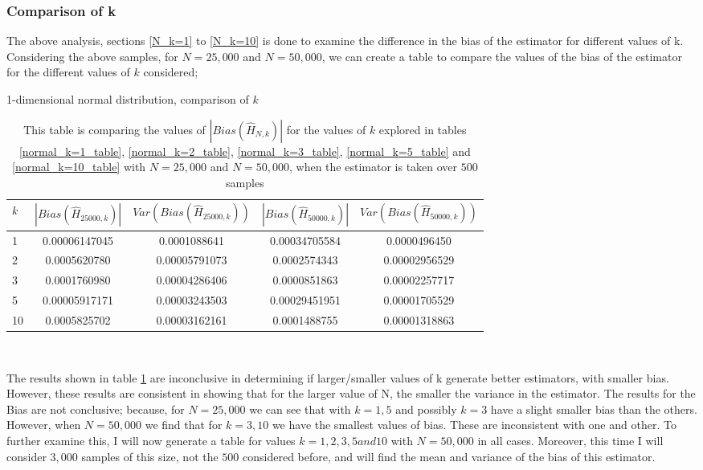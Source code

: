 \documentclass{article}
\begin{document}
\subsubsection{Comparison of k}

The above analysis, sections \ref{N_k=1} to \ref{N_k=10} is done to examine the difference in the bias of the estimator for different values of k. Considering the above samples, for $N=25,000$ and $N=50,000$, we can create a table to compare the values of the bias of the estimator for the different values of $k$ considered;

\begin{table}
\caption{1-dimensional normal distribution, comparison of $k$} \label{normal_kcompare_table}
\begin{center}
\begin{tabular}{| l | c c c c|} 
\toprule
$k$ & $|Bias(\hat{H}_{25000, k})|$ & $Var(Bias(\hat{H}_{25000, k}))$ & $|Bias(\hat{H}_{50000, k})|$ & $Var(Bias(\hat{H}_{50000, k}) )$ \\
\midrule[1pt]
1    & 0.00006147045   & 0.0001088641     & 0.00034705584   & 0.0000496450   \\
2    & 0.0005620780     & 0.00005791073   & 0.0002574343     & 0.00002956529 \\
3    & 0.0001760980     & 0.00004286406   & 0.0000851863     & 0.00002257717 \\
5    & 0.00005917171   & 0.00003243503   & 0.00029451951   & 0.00001705529 \\
10  & 0.0005825702     & 0.00003162161   & 0.0001488755     & 0.00001318863 \\
\hline
\end{tabular}
\\[10pt]
\caption*{This table is comparing the values of $|Bias(\hat{H}_{N, k})|$ for the values of $k$ explored in tables \ref{normal_k=1_table}, \ref{normal_k=2_table}, \ref{normal_k=3_table}, \ref{normal_k=5_table} and  \ref{normal_k=10_table} with $N=25,000$ and $N=50,000$, when the estimator is taken over $500$ samples}
\end{center}
\end{table}

The results shown in table \ref{normal_kcompare_table} are inconclusive in determining if larger/smaller values of k generate better estimators, with smaller bias. However, these results are consistent in showing that for the larger value of N, the smaller the variance in the estimator. The results for the Bias are not conclusive; because, for $N=25,000$ we can see that with $k=1, 5$ and possibly $k=3$ have a slight smaller bias than the others. However, when $N=50,000$ we find that for $k=3, 10$ we have the smallest values of bias. These are inconsistent with one and other. To further examine this, I will now generate a table for values $k=1, 2, 3, 5 and 10$ with $N=50,000$ in all cases. Moreover, this time I will consider $3,000$ samples of this size, not the $500$ considered before, and will find the mean and variance of the bias of this estimator.
\end{document}
